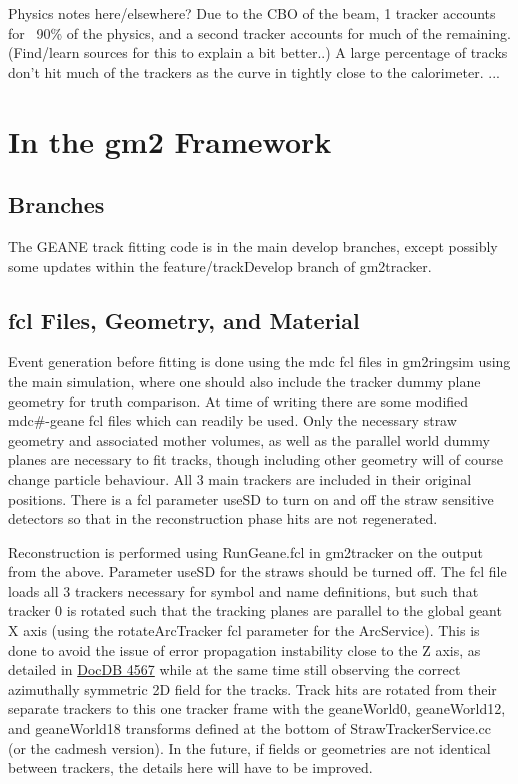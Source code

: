 \documentclass{article}
\begin{document}
 Physics notes here/elsewhere? 
 Due to the CBO of the beam, 1 tracker accounts for ~90\% of the physics, and a second tracker accounts for much of the remaining. (Find/learn sources for this to explain a bit better..)
 A large percentage of tracks don't hit much of the trackers as the curve in tightly close to the calorimeter.
 ...

\section{In the gm2 Framework}

  \subsection{Branches}

    The GEANE track fitting code is in the main develop branches, except possibly some updates within the feature/trackDevelop branch of gm2tracker. 

  \subsection{fcl Files, Geometry, and Material}

    Event generation before fitting is done using the mdc fcl files in gm2ringsim using the main simulation, where one should also include the tracker dummy plane geometry for truth comparison. At time of writing there are some modified mdc\#-geane fcl files which can readily be used. Only the necessary straw geometry and associated mother volumes, as well as the parallel world dummy planes are necessary to fit tracks, though including other geometry will of course change particle behaviour. All 3 main trackers are included in their original positions. There is a fcl parameter useSD to turn on and off the straw sensitive detectors so that in the reconstruction phase hits are not regenerated.

    Reconstruction is performed using RunGeane.fcl in gm2tracker on the output from the above. Parameter useSD for the straws should be turned off. The fcl file loads all 3 trackers necessary for symbol and name definitions, but such that tracker 0 is rotated such that the tracking planes are parallel to the global geant X axis (using the rotateArcTracker fcl parameter for the ArcService). This is done to avoid the issue of error propagation instability close to the Z axis, as detailed in \href{http://gm2-docdb.fnal.gov:8080/cgi-bin/ShowDocument?docid=4567}{DocDB 4567} while at the same time still observing the correct azimuthally symmetric 2D field for the tracks. Track hits are rotated from their separate trackers to this one tracker frame with the geaneWorld0, geaneWorld12, and geaneWorld18 transforms defined at the bottom of StrawTrackerService.cc (or the cadmesh version). In the future, if fields or geometries are not identical between trackers, the details here will have to be improved.
\end{document}

